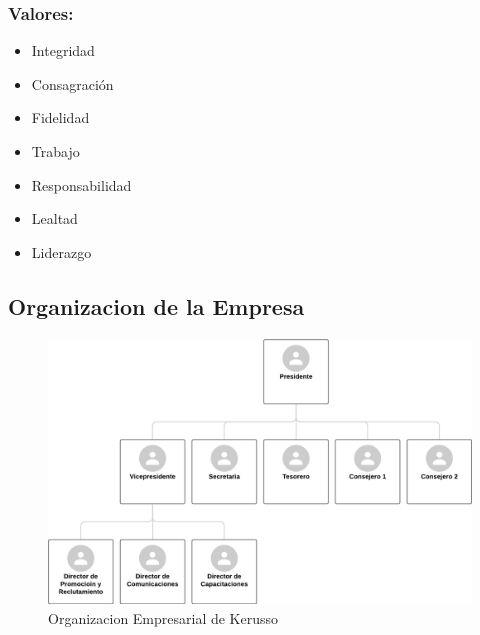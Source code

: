 \documentclass[runningheads]{llncs}
\begin{document}
            \subsubsection*{Valores: }
                \begin{itemize}
                    \item Integridad
                    \item Consagración
                    \item Fidelidad
                    \item Trabajo
                    \item Responsabilidad
                    \item Lealtad
                    \item Liderazgo
                \end{itemize}

        \subsection{Organizacion  de la Empresa}
            \begin{figure}[H]
                \centering\captionsetup{width=0.8\textwidth}
                \includegraphics[width=1\textwidth]{figures/Organigrama.png}
                \caption{Organizacion Empresarial de Kerusso} \label{fig1}
            \end{figure}
\end{document}
